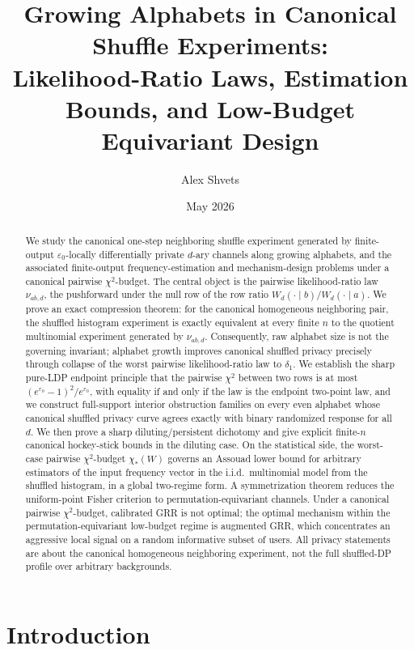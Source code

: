 \documentclass[11pt]{amsart}
\title[Growing Alphabets and Canonical Shuffle Experiments]{Growing Alphabets in Canonical Shuffle Experiments:\\
Likelihood-Ratio Laws, Estimation Bounds, and Low-Budget Equivariant Design}
\author{Alex Shvets}
\date{May 2026}
\numberwithin{equation}{section}
\theoremstyle{definition}
\begin{document}
\begin{abstract}
We study the canonical one-step neighboring shuffle experiment generated by finite-output
$\varepsilon_0$-locally differentially private $d$-ary channels along growing alphabets, and the
associated finite-output frequency-estimation and mechanism-design problems under a canonical
pairwise $\chi^2$-budget.  The central object is the pairwise likelihood-ratio law $\nu_{ab,d}$,
the pushforward under the null row of the row ratio $W_d(\cdot\mid b)/W_d(\cdot\mid a)$.  We prove
an exact compression theorem: for the canonical homogeneous neighboring pair, the shuffled
histogram experiment is exactly equivalent at every finite $n$ to the quotient multinomial
experiment generated by $\nu_{ab,d}$.  Consequently, raw alphabet size is not the governing
invariant; alphabet growth improves canonical shuffled privacy precisely through collapse of the
worst pairwise likelihood-ratio law to $\delta_1$.  We establish the sharp pure-LDP endpoint
principle that the pairwise $\chi^2$ between two rows is at most $(e^{\varepsilon_0}-1)^2/e^{\varepsilon_0}$,
with equality if and only if the law is the endpoint two-point law, and we construct full-support
interior obstruction families on every even alphabet whose canonical shuffled privacy curve agrees
exactly with binary randomized response for all $d$.  We then prove a sharp diluting/persistent
dichotomy and give explicit finite-$n$ canonical hockey-stick bounds in the diluting case.
On the statistical side, the worst-case pairwise $\chi^2$-budget $\chi_\ast(W)$ governs an Assouad
lower bound for arbitrary estimators of the input frequency vector in the i.i.d.\ multinomial
model from the shuffled histogram, in a global two-regime form.  A symmetrization theorem reduces
the uniform-point Fisher criterion to permutation-equivariant channels.  Under a canonical
pairwise $\chi^2$-budget, calibrated GRR is not optimal; the optimal mechanism within the
permutation-equivariant low-budget regime is augmented GRR, which concentrates an aggressive local
signal on a random informative subset of users.  All privacy statements are about the canonical
homogeneous neighboring experiment, not the full shuffled-DP profile over arbitrary backgrounds.
\end{abstract}

\maketitle

\section{Introduction}
\end{document}
